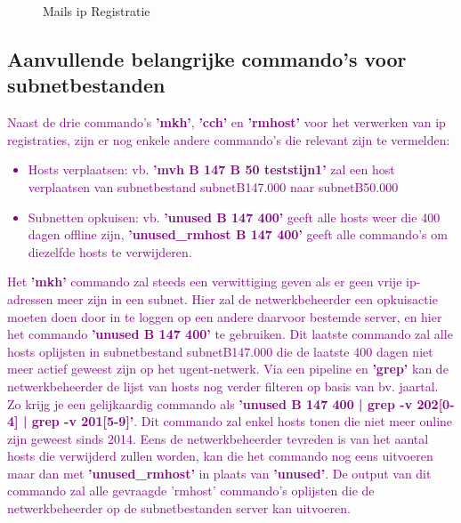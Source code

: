 \begin{figure}[H]
    \hspace*{\fill}
    \hspace*{\fill}
    \caption{Mails \acrshort{ip} Registratie}
    \label{fig:netadminMail}
\end{figure}

\subsection{Aanvullende belangrijke commando's voor subnetbestanden}
\textcolor{purple}{Naast de drie commando's \textbf{'mkh'}, \textbf{'cch'} en \textbf{'rmhost'} voor het verwerken van \acrshort{ip} registraties, zijn er nog enkele andere commando's die relevant zijn te vermelden:}
\textcolor{purple}{
    \begin{itemize}
        \item Hosts verplaatsen: vb. \textbf{'mvh B 147 B 50 teststijn1'} zal een host verplaatsen van subnetbestand subnetB147.000 naar subnetB50.000 
        \item Subnetten opkuisen: vb. \textbf{'unused B 147 400'} geeft alle hosts weer die 400 dagen offline zijn, \textbf{'unused\_rmhost B 147 400'} geeft alle commando's om diezelfde hosts te verwijderen.
    \end{itemize}
}

\textcolor{purple}{Het \textbf{'mkh'} commando zal steeds een verwittiging geven als er geen vrije \acrshort{ip}-adressen meer zijn in een subnet. Hier zal de netwerkbeheerder een opkuisactie moeten doen door in te loggen op een andere daarvoor bestemde server, en hier het commando \textbf{'unused B 147 400'} te gebruiken. Dit laatste commando zal alle hosts oplijsten in subnetbestand subnetB147.000 die de laatste 400 dagen niet meer actief geweest zijn op het \acrshort{ugent}-netwerk. Via een pipeline en \textbf{'grep'} kan de netwerkbeheerder de lijst van hosts nog verder filteren op basis van bv. jaartal. Zo krijg je een gelijkaardig commando als \textbf{'unused B 147 400 | grep -v 202[0-4] | grep -v 201[5-9]'}. 
Dit commando zal enkel hosts tonen die niet meer online zijn geweest sinds 2014. Eens de netwerkbeheerder tevreden is van het aantal hosts die verwijderd zullen worden, kan die het commando nog eens uitvoeren maar dan met \textbf{'unused\_rmhost'} in plaats van \textbf{'unused'}. De output van dit commando zal alle gevraagde 'rmhost' commando's oplijsten die de netwerkbeheerder op de subnetbestanden server kan uitvoeren.}

